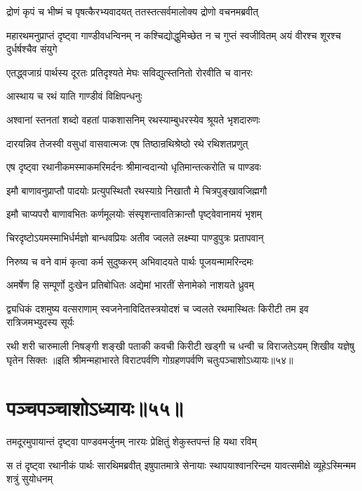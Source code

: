 \twolineshloka
{द्रोणं कृपं च भीष्मं च पृषत्कैरभ्यवादयत्}
{ततस्तत्सर्वमालोक्य द्रोणो वचनमब्रवीत्}


\threelineshloka
{महारथमनुप्राप्तं दृष्ट्वा गाण्डीवधन्विनम्}
{न कश्चिद्योद्धुमिच्छेत न च गुप्तं स्वजीवितम्}
{अयं वीरश्च शूरश्च दुर्धर्षश्चैव संयुगे}


\twolineshloka
{एतद्ध्वजाग्रं पार्थस्य दूरतः प्रतिदृश्यते}
{मेघः सविद्युत्स्तनितो रोरवीति च वानरः}


\onelineshloka
{आस्थाय च रथं याति गाण्डीवं विक्षिपन्धनुः}


\twolineshloka
{अश्वानां स्तनतां शब्दो वहतां पाकशासनिम्}
{रथस्याम्बुधरस्येव श्रूयते भृशदारुणः}


\twolineshloka
{दारयन्निव तेजस्वी वसुधां वासवात्मजः}
{एष तिष्ठान्रथिश्रेष्ठो रथे रथिशतप्रणुत्}


\twolineshloka
{एष दृष्ट्वा रथानीकमस्माकमरिमर्दनः}
{श्रीमान्वदान्यो धृतिमान्तत्करोति च पाण्डवः}


\twolineshloka
{इमौ बाणावनुप्राप्तौ पादयोः प्रत्युपस्थितौ}
{रथस्याग्रे निखातौ मे चित्रपुङ्खावजिह्मगौ}


\twolineshloka
{इमौ चाप्यपरौ बाणावभितः कर्णमूलयोः}
{संस्पृशन्तावतिक्रान्तौ पृष्ट्वेवानामयं भृशम्}


\twolineshloka
{चिरदृष्टोऽयमस्माभिर्धर्मज्ञो बान्धवप्रियः}
{अतीव ज्वलते लक्ष्म्या पाण्डुपुत्रः प्रतापवान्}


\twolineshloka
{निरुष्य च वने वामं कृत्वा कर्म सुदुष्करम्}
{अभिवादयते पार्थः पूजयन्मामरिन्दमः}


\twolineshloka
{अमर्षेण हि सम्पूर्णो दुःखेन प्रतिबोधितः}
{अद्येमां भारतीं सेनामेको नाशयते ध्रुवम्}

\fourlineindentedshloka
{द्व्यधिकं दशमुष्य वत्सराणाम्}
{स्वजनेनाविदितस्त्रयोदशं च}
{ज्वलते रथमास्थितः किरीटी}
{तम इव रात्रिजमभ्युदस्य सूर्यः}

\fourlineindentedshloka
{रथी शरी चारुमाली निषङ्गी}
{शङ्खी पताकी कवची किरीटी}
{खड्गी च धन्वी च विराजतेऽयम्}
{शिखीव यज्ञेषु घृतेन सिक्तः}
॥इति श्रीमन्महाभारते विराटपर्वणि गोग्रहणपर्वणि चतुःपञ्चाशोऽध्यायः॥५४॥

\chapter{पञ्चपञ्चाशोऽध्यायः॥५५॥}

\twolineshloka
{तमदूरमुपायान्तं दृष्ट्वा पाण्डवमर्जुनम्}
{नारयः प्रेक्षितुं शेकुस्तपन्तं हि यथा रविम्}


\threelineshloka
{स तं दृष्ट्वा रथानीकं पार्थः सारथिमब्रवीत्}
{इषुपातमात्रे सेनायाः स्थापयाश्वानरिन्दम}
{यावत्समीक्षे व्यूहेऽस्मिन्मम शत्रुं सुयोधनम्}


